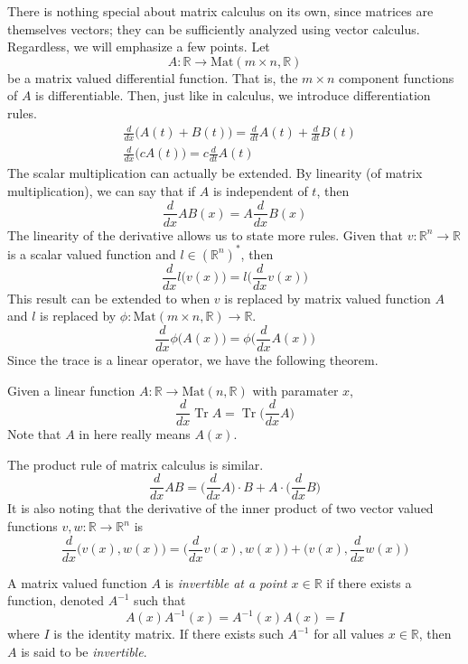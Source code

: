 \documentclass{article}
\DeclareMathOperator{\Tr}{Tr}
\begin{document}
    There is nothing special about matrix calculus on its own, since matrices are themselves vectors; they can be sufficiently analyzed using vector calculus. Regardless, we will emphasize a few points. Let
    \[A: \mathbb{R} \longrightarrow \text{Mat}(m \times n, \mathbb{R})\]
    be a matrix valued differential function. That is, the $m \times n$ component functions of $A$ is differentiable. Then, just like in calculus, we introduce differentiation rules.
    \begin{align*}
        & \frac{d}{d x} \big( A(t) + B(t)\big) = \frac{d}{d t} A(t) + \frac{d}{d t} B(t) \\
        & \frac{d}{d x} \big( c A(t)\big) = c \frac{d}{d t} A(t)
    \end{align*}
    The scalar multiplication can actually be extended. By linearity (of matrix multiplication), we can say that if $A$ is independent of $t$, then 
    \[\frac{d}{d x} A B (x) = A \frac{d}{d x} B(x)\]
    The linearity of the derivative allows us to state more rules. Given that $v: \mathbb{R}^n \longrightarrow \mathbb{R}$ is a scalar valued function and $l \in (\mathbb{R}^n)^*$, then  
    \[\frac{d}{d x} l \big( v(x) \big) = l \bigg( \frac{d}{d x} v(x) \bigg)\]
    This result can be extended to when $v$ is replaced by matrix valued function $A$ and $l$ is replaced by $\phi: \text{Mat}(m \times n, \mathbb{R}) \longrightarrow \mathbb{R}$. 
    \[\frac{d}{d x} \phi \big( A(x) \big) = \phi \bigg( \frac{d}{d x} A(x) \bigg)\]
    Since the trace is a linear operator, we have the following theorem. 

    \begin{theorem}
    Given a linear function $A: \mathbb{R} \longrightarrow \text{Mat}(n, \mathbb{R})$ with paramater $x$, 
    \[\frac{d}{d x} \Tr{A} = \Tr \bigg( \frac{d}{d x} A \bigg)\]
    Note that $A$ in here really means $A(x)$.
    \end{theorem}

    The product rule of matrix calculus is similar.
    \[\frac{d}{d x} A B = \bigg(\frac{d}{d x} A\bigg) \cdot B + A \cdot \bigg(\frac{d}{d x} B \bigg)\]
    It is also noting that the derivative of the inner product of two vector valued functions $v, w: \mathbb{R} \longrightarrow \mathbb{R}^n$ is 
    \[\frac{d}{d x} \big( v(x), w(x) \big) = \Big( \frac{d}{d x} v(x), w(x) \Big) + \Big( v(x), \frac{d}{d x} w(x) \Big)\]

    \begin{definition}
    A matrix valued function $A$ is \textit{invertible at a point $x \in \mathbb{R}$} if there exists a function, denoted $A^{-1}$ such that
    \[A(x) A^{-1} (x) = A^{-1}(x) A(x) = I\]
    where $I$ is the identity matrix. If there exists such $A^{-1}$ for all values $x \in \mathbb{R}$, then $A$ is said to be \textit{invertible}. 
    \end{definition}
\end{document}
